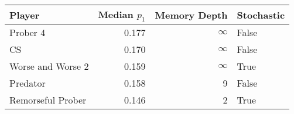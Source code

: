 \begin{tabular}{lrrl}
\toprule
            Player &  Median $p_1$ &  Memory Depth & Stochastic \\
\midrule
          Prober 4 &         0.177 &            \(\infty\) &      False \\
                CS &         0.170 &            \(\infty\) &      False \\
 Worse and Worse 2 &         0.159 &            \(\infty\) &       True \\
          Predator &         0.158 &             9 &      False \\
 Remorseful Prober &         0.146 &             2 &       True \\
\bottomrule
\end{tabular}
